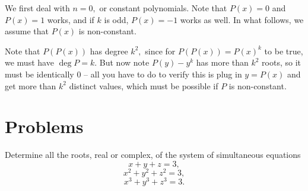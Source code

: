 \documentclass[mast]{lucky}
\begin{document}
\begin{sol}
We first deal with $n=0,$ or constant polynomials. Note that $P(x)=0$ and $P(x)=1$ works, and if $k$ is odd, $P(x)=-1$ works as well. In what follows, we assume that $P(x)$ is non-constant.

Note that $P(P(x))$ has degree $k^2,$ since for $P(P(x))=P(x)^k$ to be true, we must have $\deg P = k.$ But now note $P(y)-y^k$ has more than $k^2$ roots, so it must be identically $0$ -- all you have to do to verify this is plug in $y=P(x)$ and get more than $k^2$ distinct values, which must be possible if $P$ is non-constant.
\end{sol}

\pagebreak

\section{Problems}


\begin{prob}[USAMO 1973/4]{2}
Determine all the roots, real or complex, of the system of simultaneous equations
\[x+y+z=3,\]
\[x^2+y^2+z^2=3,\]
\[x^3+y^3+z^3=3.\]
\end{prob}
\end{document}
